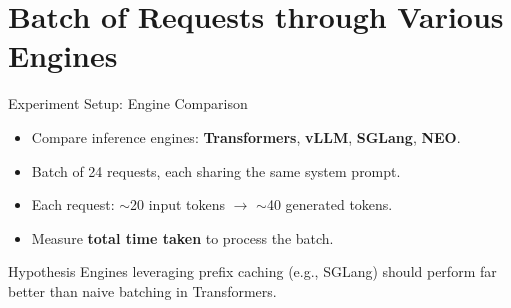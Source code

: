 \documentclass[Serif, 10pt, brown]{beamer}
\theoremstyle{example}
\theoremstyle{plain}
\begin{document}
\section{Batch of Requests through Various Engines}
\begin{frame}{Experiment Setup: Engine Comparison}
\begin{itemize}
    \item Compare inference engines: \textbf{Transformers}, \textbf{vLLM}, \textbf{SGLang}, \textbf{NEO}.
    \item Batch of 24 requests, each sharing the same system prompt.
    \item Each request: $\sim$20 input tokens $\rightarrow$ $\sim$40 generated tokens.
    \item Measure \textbf{total time taken} to process the batch.
\end{itemize}

\begin{block}{Hypothesis}
Engines leveraging prefix caching (e.g., SGLang) should perform far better than naive batching in Transformers.
\end{block}
\end{frame}
\end{document}
